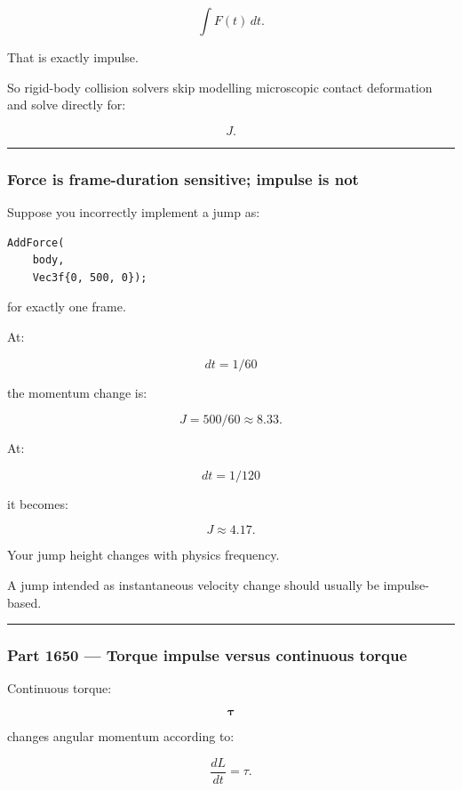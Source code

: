 \[
\int F(t)\,dt.
\]

That is exactly impulse.

So rigid-body collision solvers skip modelling microscopic contact deformation and solve directly for:

\[
J.
\]

\begin{center}\rule{0.5\linewidth}{0.5pt}\end{center}

\subsubsection{Force is frame-duration sensitive; impulse is not}\label{force-is-frame-duration-sensitive-impulse-is-not}

Suppose you incorrectly implement a jump as:

\begin{verbatim}
AddForce(
    body,
    Vec3f{0, 500, 0});
\end{verbatim}

for exactly one frame.

At:

\[
dt=1/60
\]

the momentum change is:

\[
J=500/60\approx8.33.
\]

At:

\[
dt=1/120
\]

it becomes:

\[
J\approx4.17.
\]

Your jump height changes with physics frequency.

A jump intended as instantaneous velocity change should usually be impulse-based.

\begin{center}\rule{0.5\linewidth}{0.5pt}\end{center}

\subsubsection{Part 1650 --- Torque impulse versus continuous torque}\label{part-1650-torque-impulse-versus-continuous-torque}

Continuous torque:

\[
\boldsymbol\tau
\]

changes angular momentum according to:

\[
\frac{dL}{dt}
=
\tau.
\]

